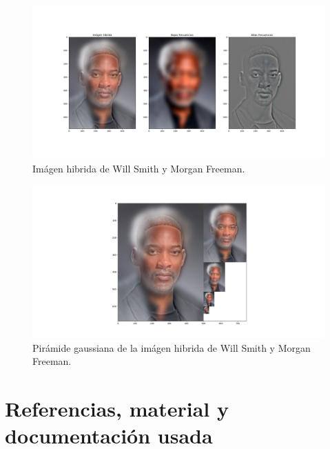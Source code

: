 \documentclass[12pt, spanish]{article}
\begin{document}
\begin{figure}[H]
  \centering
      \includegraphics[width=\textwidth]{hibridas_color/W-F.png}
 		 \caption{Imágen hibrida de Will Smith y Morgan Freeman.}
  		\label{fig:ej2al}

\end{figure}

\begin{figure}[H]
  \centering
      \includegraphics[width=\textwidth]{hibridas_color/PW-F.png}
 		 \caption{Pirámide gaussiana de la imágen hibrida de Will Smith y Morgan Freeman.}
  		\label{fig:ej2al}

\end{figure}

\newpage

\section{Referencias, material y documentación usada}
\end{document}
